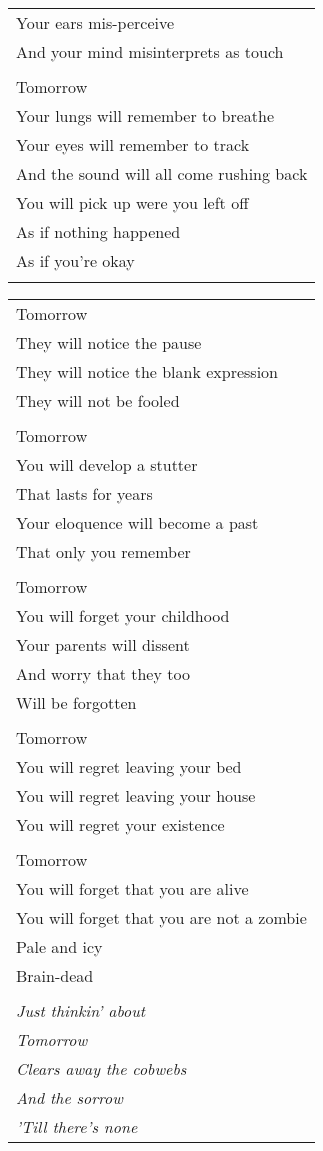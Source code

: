 \documentclass{article}
\begin{document}
\begin{center}
\begin{tabular}{l}
Your ears mis-perceive \\
And your mind misinterprets as touch \\
\\
Tomorrow \\
Your lungs will remember to breathe \\
Your eyes will remember to track \\
And the sound will all come rushing back \\
You will pick up were you left off \\
As if nothing happened \\
As if you're okay \\
\\
\end{tabular}
\begin{tabular}{l}
\\
Tomorrow \\
They will notice the pause \\
They will notice the blank expression \\
They will not be fooled \\
\\
Tomorrow \\
You will develop a stutter \\
That lasts for years \\
Your eloquence will become a past \\
That only you remember \\
\\
Tomorrow \\
You will forget your childhood \\
Your parents will dissent \\
And worry that they too \\
Will be forgotten \\
\\
Tomorrow \\
You will regret leaving your bed \\
You will regret leaving your house \\
You will regret your existence \\
\\
Tomorrow \\
You will forget that you are alive \\
You will forget that you are not a zombie \\
Pale and icy \\
Brain-dead \\
\\
\textit{Just thinkin' about} \\
\textit{Tomorrow} \\
\textit{Clears away the cobwebs} \\
\textit{And the sorrow} \\
\textit{'Till there's none} \\
\end{tabular}
\end{center}
\end{document}
